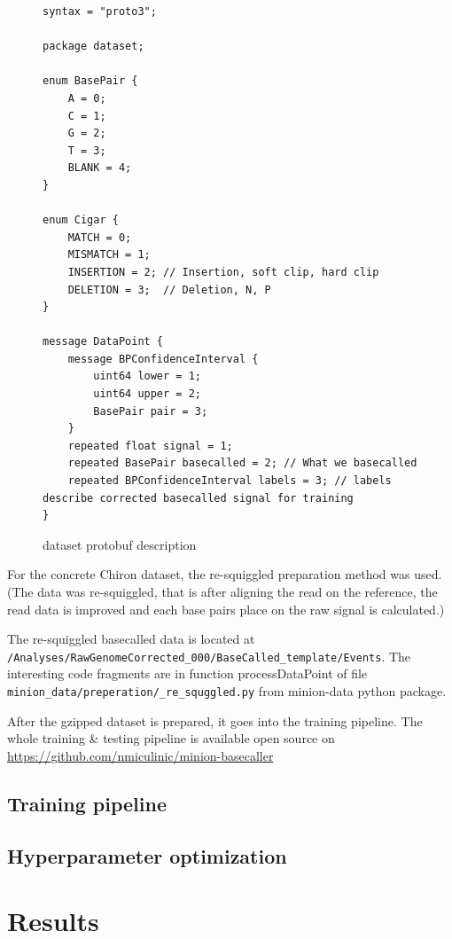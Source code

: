 \documentclass[times, utf8, diplomski, english]{fer}
\begin{document}
\begin{figure}
    \begin{center}
    \begin{lstlisting}[language=protobuf3,style=protobuf]
syntax = "proto3";

package dataset;

enum BasePair {
    A = 0;
    C = 1;
    G = 2;
    T = 3;
    BLANK = 4;
}

enum Cigar {
    MATCH = 0;
    MISMATCH = 1;
    INSERTION = 2; // Insertion, soft clip, hard clip
    DELETION = 3;  // Deletion, N, P
}

message DataPoint {
    message BPConfidenceInterval {
        uint64 lower = 1;
        uint64 upper = 2;
        BasePair pair = 3;
    }
    repeated float signal = 1;
    repeated BasePair basecalled = 2; // What we basecalled
    repeated BPConfidenceInterval labels = 3; // labels describe corrected basecalled signal for training
}
    \end{lstlisting}
    \caption{dataset protobuf description}
    \label{fg:dataset_proto}
    \end{center}
\end{figure}

For the concrete Chiron dataset, the re-squiggled preparation method was used. (The data was re-squiggled, that is after aligning the read on the reference, the read data is improved and each base pairs place on the raw signal is calculated.)

The re-squiggled basecalled data is located at \verb|/Analyses/RawGenomeCorrected_000/BaseCalled_template/Events|. The interesting code fragments are in function processDataPoint of file \verb|minion_data/preperation/_re_squggled.py| from minion-data python package.

After the gzipped dataset is prepared, it goes into the training pipeline. The whole training \& testing pipeline is available  open source on \url{https://github.com/nmiculinic/minion-basecaller}

\section{Training pipeline}
\section{Hyperparameter optimization}

\chapter{Results}
\end{document}
